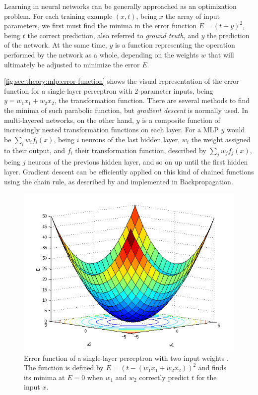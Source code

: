 Learning in neural networks can be generally approached as an optimization problem.
For each training example $(x, t)$, being $x$ the array of input parameters, we first must find the minima in the error function $E = (t - y)^2$, being $t$ the correct prediction, also referred to \emph{ground truth}, and $y$ the prediction of the network.
At the same time, $y$ is a function representing the operation performed by the network as a whole, depending on the weights $w$ that will ultimately be adjusted to minimize the error $E$.

\autoref{fig:sec:theory:mlp:error-function} shows the visual representation of the error function for a single-layer perceptron with 2-parameter inputs, being $y = w_1 x_1 + w_2 x_2$, the transformation function.
There are several methods to find the minima of such parabolic function, but \emph{gradient descent} is normally used.
In multi-layered networks, on the other hand, $y$ is a composite function of increasingly nested transformation functions on each layer.
For a MLP $y$ would be $\sum_i w_i f_i(x)$, being $i$ neurons of the last hidden layer, $w_i$ the weight assigned to their output, and $f_i$ their transformation function, described by $\sum_j w_j f_j(x)$, being $j$ neurons of the previous hidden layer, and so on up until the first hidden layer.
Gradient descent can be efficiently applied on this kind of chained functions using the chain rule, as described by \citet{Linnainmaa1976} and implemented in Backpropagation.

\begin{figure}[htb]
  \includegraphics[width=\textwidth]{gfx/error-function}
  \caption{Error function of a single-layer perceptron with two input weights \cite{AI4562013}.
    The function is defined by $E = (t - (w_1 x_1 + w_2 x_2))^2$ and finds its minima at $E = 0$ when $w_1$ and $w_2$ correctly predict $t$ for the input $x$.}
  \label{fig:sec:theory:mlp:error-function}
\end{figure}

